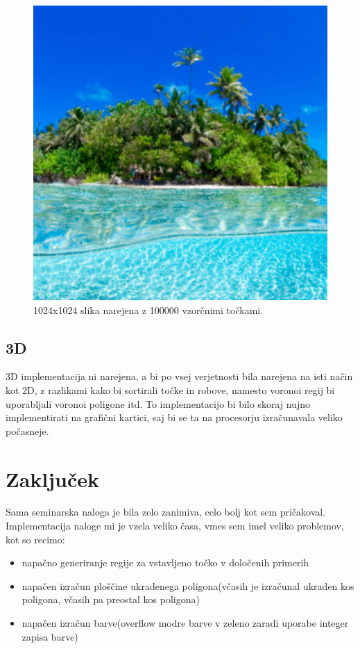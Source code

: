\documentclass{egpubl}
\begin{document}
	\begin{figure}[!htb]
		\centering
		\parbox[t]{.75\columnwidth}{\relax
			\includegraphics[width=.95\linewidth]{1024x1024x100000_result.png}
		}
		\caption{\label{fig:1024x1024x100000}
			1024x1024 slika narejena z 100000 vzorčnimi točkami.}
	\end{figure}


	\subsection{3D}
	3D implementacija ni narejena, a bi po vsej verjetnosti bila narejena na isti način kot 2D, z razlikami kako bi sortirali točke in robove, namesto voronoi regij bi uporabljali voronoi poligone itd. To implementacijo bi bilo skoraj nujno implementirati na grafični kartici, saj bi se ta na procesorju izračunavala veliko počasneje.
	
	\section{Zaključek}
	Sama seminarska naloga je bila zelo zanimiva, celo bolj kot sem pričakoval. Implementacija naloge mi je vzela veliko časa, vmes sem imel veliko problemov, kot so recimo:
	\begin{itemize}
		\item napačno generiranje regije za vstavljeno točko v določenih primerih
		\item napačen izračun ploščine ukradenega poligona(včasih je izračunal ukraden kos poligona, včasih pa preostal kos poligona)
		\item napačen izračun barve(overflow modre barve v zeleno zaradi uporabe integer zapisa barve) 
	\end{itemize}
\end{document}
